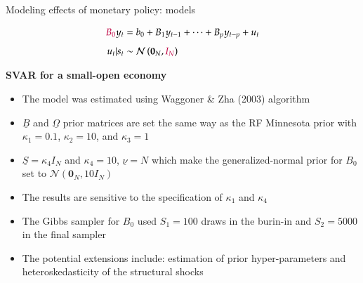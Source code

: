 \documentclass[notes,blackandwhite,mathsans,usenames,dvipsnames]{beamer}
\begin{document}
\begin{frame}{Modeling effects of monetary policy: {\color{purple}models}}

\begin{align*}
{\color{purple}B_0} y_{t} &= b_0 + B_1 y_{t-1} + \dots + B_p y_{t-p} + u_t\\[1ex]
u_t|s_t &\sim \mathcal{N}\left( \mathbf{0}_N, {\color{purple}I_N} \right)
\end{align*}

\bigskip\textbf{SVAR for a small-open economy}\small
\begin{itemize}[label=$\blacktriangleright$]
\item The model was estimated using Waggoner \& Zha (2003) algorithm
\item $\underline{B}$ and $\underline{\Omega}$ prior matrices are set the same way as the RF Minnesota prior with $\kappa_1= 0.1$, $\kappa_2=10$, and $\kappa_3=1$
\item $\underline{S}=\kappa_4I_N$ and $\kappa_4=10$, $\underline{\nu}=N$ which make the generalized-normal prior for $B_0$ set to $\mathcal{N}(\mathbf{0}_N,10 I_N)$
\item The results are sensitive to the specification of $\kappa_1$ and $\kappa_4$
\item The Gibbs sampler for $B_0$ used $S_1=100$ draws in the burin-in and $S_2=5000$ in the final sampler
\item The potential extensions include: estimation of prior hyper-parameters and heteroskedasticity of the structural shocks
\end{itemize}

\end{frame}
\end{document}
